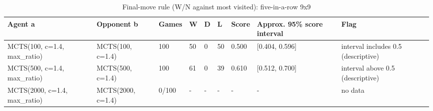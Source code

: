 \begin{table}[!t]
\centering
\caption{Final-move rule (W/N against most visited): five-in-a-row 9x9}
\label{tab:final_gomoku9}
\small
\begin{tabular}{lllllllll}
\toprule
Agent a & Opponent b & Games & W & D & L & Score & Approx. 95\% score interval & Flag \\
\midrule
MCTS(100, c=1.4, max\_ratio) & MCTS(100, c=1.4) & 100 & 50 & 0 & 50 & 0.500 & [0.404, 0.596] & interval includes 0.5 (descriptive) \\
MCTS(500, c=1.4, max\_ratio) & MCTS(500, c=1.4) & 100 & 61 & 0 & 39 & 0.610 & [0.512, 0.700] & interval above 0.5 (descriptive) \\
MCTS(2000, c=1.4, max\_ratio) & MCTS(2000, c=1.4) & 0/100 & - & - & - & - & - & no data \\
\bottomrule
\end{tabular}
\end{table}
